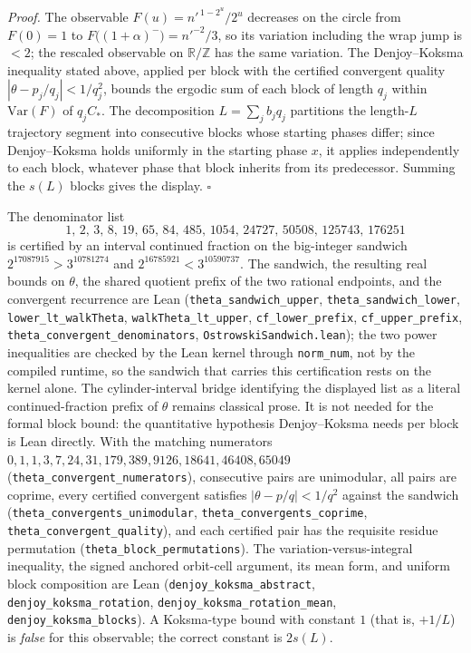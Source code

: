 \documentclass[12pt]{article}
\begin{document}
\emph{Proof.} The observable \(F(u)=n'^{\,1-2^u}/2^u\) decreases on the
circle from \(F(0)=1\) to \(F\bigl((1+\alpha)^-\bigr)
=n'^{-2}/3\), so its variation including the wrap jump is \(<2\); the
rescaled observable on \(\mathbb R/\mathbb Z\) has the same variation.
The Denjoy--Koksma inequality stated above, applied per block with the
certified convergent quality \(|\theta-p_j/q_j|<1/q_j^2\), bounds the
ergodic sum of each block of length \(q_j\) within \(\mathrm{Var}(F)\)
of \(q_jC_*\). The decomposition \(L=\sum_jb_jq_j\) partitions the
length-\(L\) trajectory segment into consecutive blocks whose starting
phases differ; since Denjoy--Koksma holds uniformly in the starting
phase \(x\), it applies independently to each block, whatever phase that
block inherits from its predecessor. Summing the \(s(L)\) blocks gives
the display. \(\square\)

The denominator list \[
1,\,2,\,3,\,8,\,19,\,65,\,84,\,485,\,1054,\,24727,\,50508,\,
125743,\,176251
\] is certified by an interval continued fraction on the big-integer
sandwich \(2^{17087915}>3^{10781274}\) and
\(2^{16785921}<3^{10590737}\). The sandwich, the resulting real bounds
on \(\theta\), the shared quotient prefix of the two rational endpoints,
and the convergent recurrence are Lean
(\texttt{\nolinkurl{theta_sandwich_upper}},
\texttt{\nolinkurl{theta_sandwich_lower}},
\texttt{\nolinkurl{lower_lt_walkTheta}},
\texttt{\nolinkurl{walkTheta_lt_upper}},
\texttt{\nolinkurl{cf_lower_prefix}},
\texttt{\nolinkurl{cf_upper_prefix}},
\texttt{\nolinkurl{theta_convergent_denominators}},
\texttt{\nolinkurl{OstrowskiSandwich.lean}}); the two power inequalities
are checked by the Lean kernel through \texttt{\nolinkurl{norm_num}},
not by the compiled runtime, so the sandwich that carries this
certification rests on the kernel alone. The cylinder-interval bridge
identifying the displayed list as a literal continued-fraction prefix of
\(\theta\) remains classical prose. It is not needed for the formal
block bound: the quantitative hypothesis Denjoy--Koksma needs per block
is Lean directly. With the matching numerators
\(0,1,1,3,7,24,31,179,389,9126,18641,
46408,65049\) (\texttt{\nolinkurl{theta_convergent_numerators}}),
consecutive pairs are unimodular, all pairs are coprime, every certified
convergent satisfies \(|\theta-p/q|<1/q^2\) against the sandwich
(\texttt{\nolinkurl{theta_convergents_unimodular}},
\texttt{\nolinkurl{theta_convergents_coprime}},
\texttt{\nolinkurl{theta_convergent_quality}}), and each certified pair
has the requisite residue permutation
(\texttt{\nolinkurl{theta_block_permutations}}). The
variation-versus-integral inequality, the signed anchored orbit-cell
argument, its mean form, and uniform block composition are Lean
(\texttt{\nolinkurl{denjoy_koksma_abstract}},
\texttt{\nolinkurl{denjoy_koksma_rotation}},
\texttt{\nolinkurl{denjoy_koksma_rotation_mean}},
\texttt{\nolinkurl{denjoy_koksma_blocks}}). A Koksma-type bound with
constant \(1\) (that is, \(+1/L\)) is \emph{false} for this observable;
the correct constant is \(2s(L)\).
\end{document}
